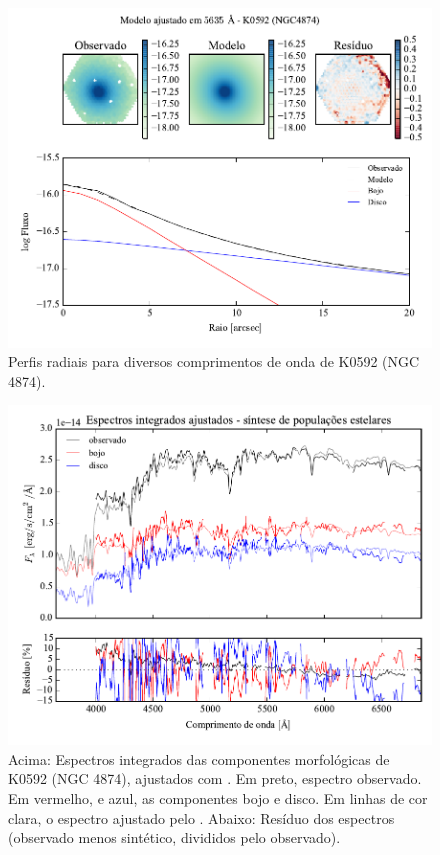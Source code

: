 \begin{figure}
	\includegraphics[page=5]{figuras-decomp/K0592_sample006a}
	\caption[Perfis radiais para diversos comprimentos de onda de K0592 (NGC 4874)]
	{Perfis radiais para diversos comprimentos de onda de K0592 (NGC 4874).}
	\label{fig:decompRadprofSpec:K0592}
\end{figure}

\begin{figure}
	\includegraphics[page=5,width=\textwidth]{figuras/sample006a_synthesis}
	\caption[Espectros ajustados com \starlight das componentes morfológicas de
	K0592 (NGC 4874)]
	{Acima: Espectros integrados das componentes morfológicas de
	K0592 (NGC 4874), ajustados com \starlight. Em preto, espectro observado. Em
	vermelho, e azul, as componentes bojo e disco. Em linhas de cor clara, o
	espectro ajustado pelo \starlight. Abaixo: Resíduo dos espectros (observado
	menos sintético, divididos pelo observado).}
	\label{fig:decompSintese:K0592}
\end{figure}

